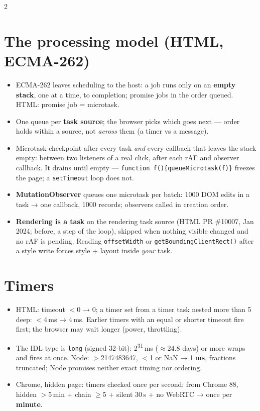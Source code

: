 \documentclass[8pt]{extarticle}
\newcommand\ct[1]{\texttt{#1}}
\begin{document}
\begin{multicols}{2}
\section{The processing model (HTML, ECMA-262)}
\begin{itemize}
  \item ECMA-262 leaves scheduling to the host: a job runs only on an \textbf{empty stack}, one at
        a time, to completion; promise jobs in the order queued. HTML: promise job = microtask.
  \item One queue per \textbf{task source}; the browser picks which goes next — order holds
        within a source, not \emph{across} them (a timer vs a message).
  \item Microtask checkpoint after every task \emph{and} every callback that leaves the stack
        empty: between two listeners of a real click, after each rAF and observer callback. It
        drains until empty — \ct{function f()\{queueMicrotask(f)\}} freezes the page; a
        \ct{setTimeout} loop does not.
  \item \textbf{MutationObserver} queues one microtask per batch: 1000 DOM edits in a task → one
        callback, 1000 records; observers called in creation order.
  \item \textbf{Rendering is a task} on the rendering task source (HTML PR \#10007, Jan 2024; before,
        a step of the loop), skipped when nothing visible changed and no rAF is pending. Reading
        \ct{offsetWidth} or \ct{getBoundingClientRect()} after a style write forces style + layout
        inside \emph{your} task.
\end{itemize}

\section{Timers}
\begin{itemize}
  \item HTML: timeout $<$0 → 0; a timer set from a timer task nested more than 5 deep:
        $<$4\,ms → 4\,ms. Earlier timers with an equal or shorter timeout fire first; the browser
        may wait longer (power, throttling).
  \item The IDL type is \ct{long} (signed 32-bit): 2\textsuperscript{31}\,ms ($\approx$24.8 days)
        or more wraps and fires at once. Node: $>$2147483647, $<$1 or NaN → \textbf{1\,ms},
        fractions truncated; Node promises neither exact timing nor ordering.
  \item Chrome, hidden page: timers checked once per second; from Chrome 88, hidden $>$5\,min +
        chain $\geq$5 + silent 30\,s + no WebRTC → once per \textbf{minute}.
\end{itemize}


\end{multicols}
\end{document}
